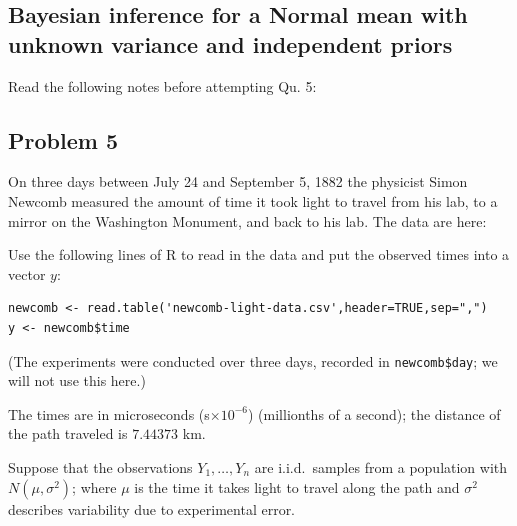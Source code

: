 \documentclass{article}
\newcommand{\1}{\mathbf{1}}
\begin{document}
\newpage
\subsection*{Bayesian inference for a Normal mean with unknown variance and independent priors}
\noindent Read the following notes before attempting Qu. 5:
 
\par
{}\par
\medskip



\subsection*{Problem 5} 
On three days between July 24 and September 5, 1882 the physicist Simon Newcomb measured the amount of time it took light to travel from his lab, to a mirror on the Washington Monument, and back to his lab. The data are here:


Use the following lines of R to read in the data and put the observed times into a vector $y$:%
{\small
\begin{verbatim}
newcomb <- read.table('newcomb-light-data.csv',header=TRUE,sep=",")
y <- newcomb$time
\end{verbatim}}%
{\small (The experiments were conducted over three days, recorded in {\tt newcomb\$day}; we will not use this here.)}

The times are in microseconds (s$\times 10^{-6}$) (millionths of a second); the distance of the path traveled is $7.44373$ km.  

Suppose that the observations $Y_1,\ldots ,Y_{n}$ are i.i.d.~samples from a population with $N(\mu,\sigma^2)$; where $\mu$ is the time it takes light to travel along the path and $\sigma^2$ describes variability due to experimental error.
\end{document}
